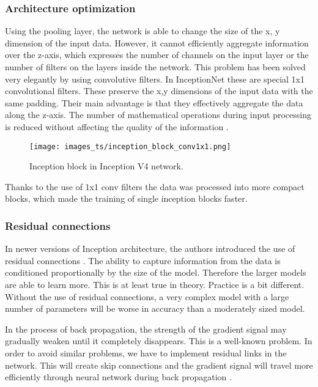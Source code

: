 \documentclass[thesis=M,english]{FITthesis}[2019/12/23]
\begin{document}
\subsubsection{Architecture optimization}
Using the pooling layer, the network is able to change the size of the x, y dimension of the input data. However, it cannot efficiently aggregate information over the z-axis, which expresses the number of channels on the input layer or the number of filters on the layers inside the network. This problem has been solved very elegantly by using convolutive filters. In InceptionNet these are special 1x1 convolutional filters. These preserve the x,y dimensions of the input data with the same padding. Their main advantage is that they effectively aggregate the data along the z-axis. The number of mathematical operations during input processing is reduced without affecting the quality of the information \cite{one_one_conv}.

\begin{figure}[ht!]
    \texttt{[image: images\_ts/inception\_block\_conv1x1.png]}
    \caption{Inception block in Inception V4 network. } 
    \label{fig:inception_block_onexone_conv}
    \centering
\end{figure}

Thanks to the use of 1x1 conv filters the data was processed into more compact blocks, which made the training of single inception blocks faster.

\subsubsection{Residual connections}
In newer versions of Inception architecture, the authors introduced the use of residual connections \cite{resnet_cnn}. 
The ability to capture information from the data is conditioned proportionally by the size of the model. Therefore the larger models are able to learn more. This is at least true in theory. Practice is a bit different. Without the use of residual connections, a very complex model with a large number of parameters will be worse in accuracy than a moderately sized model. 

In the process of back propagation, the strength of the gradient signal may gradually weaken until it completely disappears. This is a well-known problem. In order to avoid similar problems, we have to implement residual links in the network. This will create skip connections and the gradient signal will travel more efficiently through neural network during back propagation \cite{resnet_cnn}.
\end{document}
